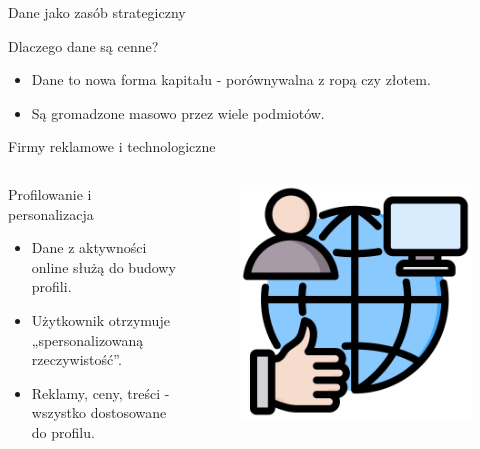     
    \begin{frame}{Dane jako zasób strategiczny}
    \begin{alertblock}{Dlaczego dane są cenne?}
        \begin{itemize}
          \item Dane to nowa forma kapitału - porównywalna z ropą czy złotem.
          \item Są gromadzone masowo przez wiele podmiotów.
        \end{itemize}
    \end{alertblock}
    \end{frame}
    
    
    \begin{frame}{Firmy reklamowe i technologiczne}
    \begin{columns}[c]
        \begin{alertblock}{Profilowanie i personalizacja}
            \begin{itemize}
              \item Dane z aktywności online służą do budowy profili.
              \item Użytkownik otrzymuje „spersonalizowaną rzeczywistość”.
              \item Reklamy, ceny, treści - wszystko dostosowane do profilu. \cite{EFF}
            \end{itemize}
        \end{alertblock}
        \begin{figure}
          \centering
          \includegraphics[height=0.45\textheight]{images/social-network.png}
        \end{figure}
    \end{columns}
    \end{frame}
    
